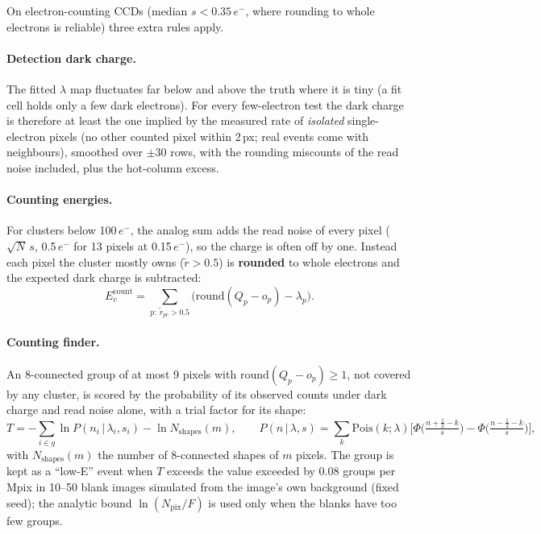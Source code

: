 \documentclass[11pt,a4paper]{article}
\newcommand{\el}{\ensuremath{e^-}}
\begin{document}
On electron-counting CCDs (median $s<0.35$\,\el, where rounding to whole electrons is reliable) three extra rules apply.

\paragraph{Detection dark charge.} The fitted $\lambda$ map fluctuates far below and above the truth where it is tiny (a fit cell
holds only a few dark electrons). For every few-electron test the dark charge is therefore at least the one implied by the
measured rate of \emph{isolated} single-electron pixels (no other counted pixel within 2\,px; real events come with neighbours),
smoothed over $\pm30$ rows, with the rounding miscounts of the read noise included, plus the hot-column excess.

\paragraph{Counting energies.} For clusters below 100\,\el, the analog sum adds the read noise of every pixel ($\sqrt N\,s$,
0.5\,\el{} for 13 pixels at 0.15\,\el), so the charge is often off by one. Instead each pixel the cluster mostly owns
($\tilde r>0.5$) is \textbf{rounded} to whole electrons and the expected dark charge is subtracted:
\begin{equation}
E_c^\mathrm{count}=\sum_{p:\ \tilde r_{pc}>0.5}\Big(\mathrm{round}(Q_p-o_p)-\lambda_p\Big).
\end{equation}

\paragraph{Counting finder.} An 8-connected group of at most 9 pixels with $\mathrm{round}(Q_p-o_p)\ge1$, not covered by any
cluster, is scored by the probability of its observed counts under dark charge and read noise alone, with a trial factor for
its shape:
\begin{equation}
T=-\sum_{i\in g}\ln P(n_i\,|\,\lambda_i,s_i)-\ln N_\mathrm{shapes}(m),\qquad
P(n\,|\,\lambda,s)=\sum_k \mathrm{Pois}(k;\lambda)\Big[\Phi\big(\tfrac{n+\frac12-k}{s}\big)-\Phi\big(\tfrac{n-\frac12-k}{s}\big)\Big],
\end{equation}
with $N_\mathrm{shapes}(m)$ the number of 8-connected shapes of $m$ pixels. The group is kept as a ``low-E'' event when $T$
exceeds the value exceeded by 0.08 groups per Mpix in 10--50 blank images simulated from the image's own background
(fixed seed); the analytic bound $\ln(N_\mathrm{pix}/F)$ is used only when the blanks have too few groups.
\end{document}
